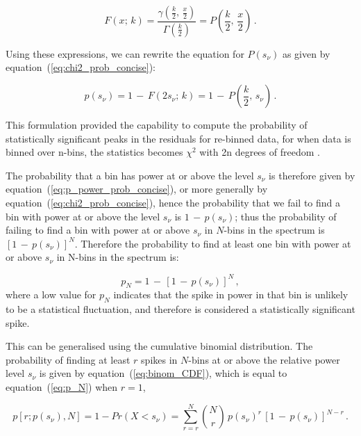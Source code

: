 \begin{equation}
F(x; \, k) = \frac{\gamma (\frac{k}{2}, \, \frac{x}{2})}{\Gamma(\frac{k}{2})} = P\left(\frac{k}{2}, \, \frac{x}{2}\right) \, .
\label{eq:chi2_CDF}
\end{equation}


Using these expressions, we can rewrite the equation for $P(s_{\nu})$ as given by equation~(\ref{eq:chi2_prob_concise}): 

\begin{equation}
p(s_{\nu}) = 1 \, - \, F(2s_{\nu}; \, k) =1 \, - \, P\left(\frac{k}{2}, \, s_{\nu}\right) \, .
\label{eq:chi2_prob_concise}
\end{equation}

This formulation provided the capability to compute the probability of statistically significant peaks in the residuals for re-binned data, for when data is binned over n-bins, the statistics becomes $\chi^{2}$ with 2n degrees of freedom \citep{appourchaux_detecting_2004}.

The probability that a bin has power at or above the level $s_{\nu}$ is therefore given by equation~(\ref{eq:p_power_prob_concise}), or more generally by equation~(\ref{eq:chi2_prob_concise}), hence the probability that we fail to find a bin with power at or above the level $s_{\nu}$ is $1 \, - \, p(s_{\nu})$; thus the probability of failing to find a bin with power at or above $s_{\nu}$ in $N$-bins in the spectrum is $[1 \, - \, p(s_{\nu})]^N$. Therefore the probability to find at least one bin with power at or above $s_{\nu}$ in N-bins in the spectrum is:

\begin{equation}
p_N = 1\, - \, [1 \, - \, p(s_{\nu})]^N \, ,
\label{eq:p_N}
\end{equation}
%
where a low value for $p_N$ indicates that the spike in power in that bin is unlikely to be a statistical fluctuation, and therefore is considered a statistically significant spike.

This can be generalised using the cumulative binomial distribution. The probability of finding at least $r$ spikes in $N$-bins at or above the relative power level $s_{\nu}$ is given by equation~(\ref{eq:binom_CDF}), which is equal to equation~(\ref{eq:p_N}) when $r=1$,

\begin{equation}
p[r; p(s_\nu), N] = 1 - Pr(X < s_{\nu}) = \sum_{r=r}^{N} \binom{N}{r} \, p(s_{\nu})^r \, [1 \, - \, p(s_{\nu})]^{N-r} \, .
\label{eq:binom_CDF}
\end{equation}

